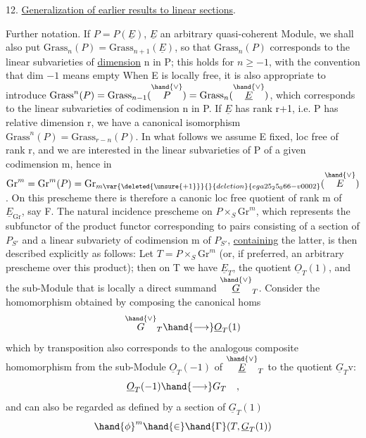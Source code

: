 
12. \uline{Generalization of earlier results to linear sections}.

Further notation. If $P = P(\underline{E})$, $\underline{E}$ an arbitrary quasi-coherent
Module, we shall also put $\mathrm{Grass}_n(P) = \mathrm{Grass}_{n+1}(\underline{E})$, so that
$\mathrm{Grass}_n(P)$ corresponds to the linear subvarieties of \uline{dimension} n in
P; this holds for $n \geq -1$, with the convention that dim $-1$ means empty
When E is locally free,  it is also appropriate to introduce
$\mathrm{Grass}^n(P) = \mathrm{Grass}_{n-1}(\overset{\hand{\vee}}{P}) = \mathrm{Grass}_n(\overset{\hand{\vee}}{\underline{E}})$, which corresponds to the linear
subvarieties of codimension n in P. If $\underline{E}$ has rank r+1, i.e.
P has relative dimension r, we have a canonical isomorphism
$\mathrm{Grass}^n(P) = \mathrm{Grass}_{r-n}(P)$. In what follows we assume E fixed, loc
free of rank r, and we are interested in the linear subvarieties
of P of a given codimension m, hence in $\mathrm{Gr}^m = \mathrm{Gr}^m(P) = \mathrm{Gr}_{m\var{\deleted{\unsure{+1}}}{}{deletion}{ega25_25_066-v0002}}(\overset{\hand{\vee}}{E})$.
On this prescheme there is therefore a canonic loc free quotient  of rank m
of $\underline{E}_{\mathrm{Gr}}$, say F.  The natural incidence prescheme
on $P\times_S \mathrm{Gr}^m$, which represents the subfunctor of the product functor
corresponding to pairs consisting of a section of $P_{S'}$ and a linear
subvariety of codimension m of $P_{S'}$, \uline{containing} the latter, is then described
explicitly as follows: Let $T=P\times_S \mathrm{Gr}^m$ (or, if preferred, an
arbitrary prescheme over this product); then on  T we have
$\underline{E}_T$, the quotient $\underline{O}_T(1)$, and the sub-Module that is locally a direct summand
$\overset{\hand{\vee}}{\underline{G}}_T$. Consider the homomorphism obtained by composing the canonical homs
\[ \overset{\hand{\vee}}{G}_T \hand{\longrightarrow} \underline{O}_T(1) \]
which by transposition also corresponds to the analogous composite
homomorphism from the sub-Module $\underline{O}_T(-1)$ of $\overset{\hand{\vee}}{\underline{E}}_T$ to the quotient $\underline{G}_T\mathrm{v}$:
\[ \underline{O}_T(-1) \hand{\longrightarrow} G_T \quad , \]
and can also be regarded as defined by a section of $\underline{G}_T(1)$
\[ \hand{\phi}^m \hand{\in} \hand{\Gamma}(T, \underline{G}_T(1)) \]

